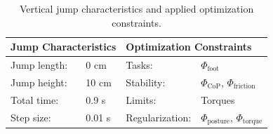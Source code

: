 \begin{table}[t]
\centering
\caption[Vertical jump characteristics and optimization constraints]{Vertical jump characteristics and applied optimization constraints.}
\begin{tabular}{|ll|ll|}
\hline
\multicolumn{2}{|l|}{\textbf{Jump Characteristics}} & \multicolumn{2}{l|}{\textbf{Optimization Constraints}} \\ \hline
Jump length:& 0 cm 	& Tasks: 			& $\Phi_{\text{foot}}$ \\ \hline
Jump height:& 10 cm	& Stability:    		& $\Phi_{\text{CoP}}$, $\Phi_{\text{friction}}$\\ \hline
Total time:& 0.9 s 	& Limits: 			& Torques\\ \hline
Step size:& 0.01 s 	& Regularization: 	& $\Phi_{\text{posture}}$, $\Phi_{\text{torque}}$\\ \hline
\end{tabular}
\label{tab:jumpVertical}
\end{table}


